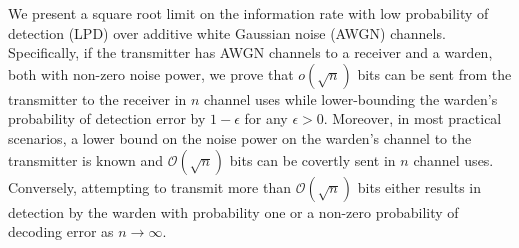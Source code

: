 We present a square root limit on the information rate with low probability of detection (LPD) over additive white Gaussian noise (AWGN) channels. Specifically, if the transmitter has AWGN channels to a receiver and a warden, both with non-zero noise power, we prove that $o(\sqrt{n})$ bits can be sent from the transmitter to the receiver in $n$ channel uses while lower-bounding the warden's probability of detection error by $1-\epsilon$ for any $\epsilon>0$. Moreover, in most practical scenarios, a lower bound on the noise power on the warden's channel to the transmitter is known and $\mathcal{O}(\sqrt{n})$ bits can be covertly sent in $n$ channel uses. Conversely, attempting to transmit more than $\mathcal{O}(\sqrt{n})$ bits either results in detection by the warden with probability one or a non-zero probability of decoding error as $n\rightarrow\infty$. %
